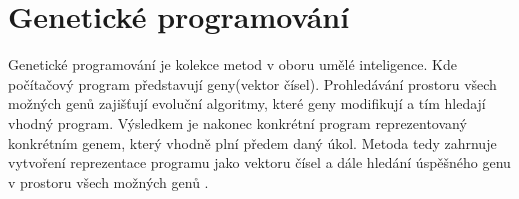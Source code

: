 \chapter{Genetické programování}
Genetické programování je kolekce metod v oboru umělé inteligence. Kde počítačový program představují geny(vektor čísel). Prohledávání prostoru všech možných genů zajišťují evoluční algoritmy, které geny modifikují a tím hledají vhodný program. Výsledkem je nakonec konkrétní program reprezentovaný konkrétním genem, který vhodně plní předem daný úkol. Metoda tedy zahrnuje vytvoření reprezentace programu jako vektoru čísel a dále hledání úspěšného genu v prostoru všech možných genů \citep{field}.